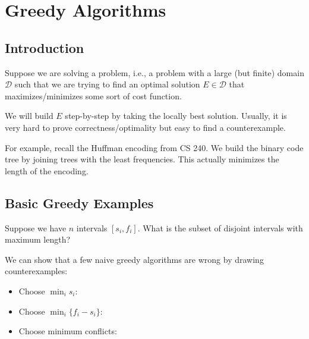 \chapter{Greedy Algorithms}

\section{Introduction}

Suppose we are solving a  problem,
i.e., a problem with a large (but finite) domain $\mathcal D$
such that we are trying to find an optimal solution $E \in \mathcal D$
that maximizes/minimizes some sort of cost function.

We will build $E$ step-by-step by taking the locally best solution.
Usually, it is very hard to prove correctness/optimality
but easy to find a counterexample.

For example, recall the Huffman encoding from CS 240.
We build the binary code tree by joining trees with the least frequencies.
This actually minimizes the length of the encoding.

\section{Basic Greedy Examples}

\begin{problem}\label{prob:g:intsched}
  Suppose we have $n$ intervals $[s_i, f_i]$.
  What is the subset of disjoint intervals with maximum length?
\end{problem}

We can show that a few naive greedy algorithms are wrong by drawing counterexamples:
\begin{itemize}
  \item Choose $\min_i s_i$: 
  \item Choose $\min_i\{f_i - s_i\}$: 
  \item Choose minimum conflicts:
\end{itemize}

